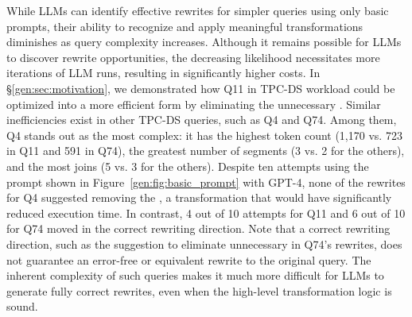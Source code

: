 




 While LLMs can identify effective rewrites for simpler queries using only basic prompts, their ability to recognize and apply meaningful transformations diminishes as query complexity increases.
Although it remains possible for LLMs to discover rewrite opportunities, the decreasing likelihood necessitates more iterations of LLM runs, resulting in significantly higher costs. In \S\ref{gen:sec:motivation}, we demonstrated how Q11 in TPC-DS workload could be optimized into a more efficient form by eliminating the unnecessary \sqlunionallcolor. Similar inefficiencies exist in other TPC-DS queries, such as Q4 and Q74. Among them, Q4 stands out as the most complex: it has the highest token count (1,170 vs. 723 in Q11 and 591 in Q74), the greatest number of \sqlunionallcolor segments (3 vs. 2 for the others), and the most joins (5 vs. 3 for the others). Despite ten attempts using the prompt shown in Figure~\ref{gen:fig:basic_prompt} with GPT-4, none of the rewrites for Q4 suggested removing the \sqlunionallcolor, a transformation that would have significantly reduced execution time. In contrast, 4 out of 10 attempts for Q11 and 6 out of 10 for Q74 moved in the correct rewriting direction. Note that a correct rewriting direction, such as the suggestion to eliminate unnecessary \sqlunionallcolor in Q74's rewrites, does not guarantee an error-free or equivalent rewrite to the original query. The inherent complexity of such queries makes it much more difficult for LLMs to generate fully correct rewrites, even when the high-level transformation logic is sound.


